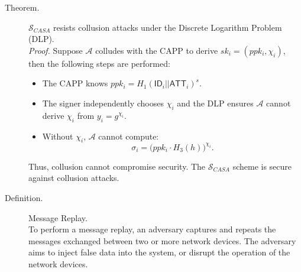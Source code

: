 \begin{description}
    \item[Theorem.] $\mathcal{S}_{CASA}$ resists collusion attacks under the Discrete Logarithm Problem (DLP).\\
    \textit{Proof.} Suppose $\mathcal{A}$ colludes with the CAPP to derive $sk_i = (ppk_i, \chi_i)$, then the following steps are performed:
    \begin{itemize}
        \item The CAPP knows $ppk_i = H_1(\mathsf{ID}_i || \mathsf{ATT}_i)^{s}$.
        \item The signer independently chooses $\chi_i$ and the DLP ensures $\mathcal{A}$ cannot derive $\chi_i$ from $y_i = g^{\chi_i}$.
        \item Without $\chi_i$, $\mathcal{A}$ cannot compute:
        \[
        \sigma_i = \big(ppk_i \cdot H_3(h)\big)^{\chi_i}.
        \]
    \end{itemize}
    Thus, collusion cannot compromise security.
    The $\mathcal{S}_{CASA}$ scheme is secure against collusion attacks.

    \item[Definition.] Message Replay.\\
    To perform a message replay, an adversary captures and repeats the messages exchanged between two or more network devices.
    The adversary aims to inject false data into the system, or disrupt the operation of the network devices.


\end{description}
